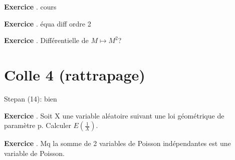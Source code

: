 \documentclass[10pt,a4paper]{article}
\newcounter{question}
\newcounter{exo}
\newenvironment{exo}{\vspace{0.5cm}\setcounter{question}{0}\addtocounter{exo}{1} \noindent \textbf{Exercice \theexo}. \normalsize }{\par}
\begin{document}
	\begin{exo}
		cours
	\end{exo}

	\begin{exo}
		équa diff ordre 2
	\end{exo}
	\begin{exo}
		Différentielle de $M \longmapsto M^2$?
	\end{exo}

	\section*{Colle 4 (rattrapage)}
	\setcounter{exo}{0}
	Stepan (14): bien\\
	
	\begin{exo}
		Soit X une variable aléatoire suivant une loi géométrique de paramètre p. Calculer $E(\frac{1}{X})$.
	\end{exo}
	
	\begin{exo}
		Mq la somme de 2 variables de Poisson indépendantes est une variable de Poisson.
	\end{exo}
\end{document}
